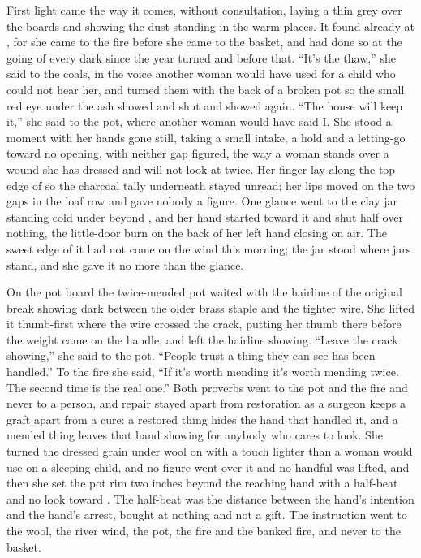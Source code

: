 First light came the way it comes, without consultation, laying a thin grey over the boards and showing the dust standing in the warm places. It found  already at , for she came to the fire before she came to the basket, and had done so at the going of every dark since the year turned and before that. “It's the thaw,” she said to the coals, in the voice another woman would have used for a child who could not hear her, and turned them with the back of a broken pot so the small red eye under the ash showed and shut and showed again. “The house will keep it,” she said to the pot, where another woman would have said I. She stood a moment with her hands gone still, taking a small intake, a hold and a letting-go toward no opening, with neither gap figured, the way a woman stands over a wound she has dressed and will not look at twice. Her finger lay along the top edge of  so the charcoal tally underneath stayed unread; her lips moved on the two gaps in the loaf row and gave nobody a figure. One glance went to the clay jar standing cold under  beyond , and her hand started toward it and shut half over nothing, the little-door burn on the back of her left hand closing on air. The sweet edge of it had not come on the wind this morning; the jar stood where jars stand, and she gave it no more than the glance.

On the pot board the twice-mended pot waited with the hairline of the original break showing dark between the older brass staple and the tighter wire. She lifted it thumb-first where the wire crossed the crack, putting her thumb there before the weight came on the handle, and left the hairline showing. “Leave the crack showing,” she said to the pot. “People trust a thing they can see has been handled.” To the fire she said, “If it's worth mending it's worth mending twice. The second time is the real one.” Both proverbs went to the pot and the fire and never to a person, and repair stayed apart from restoration as a surgeon keeps a graft apart from a cure: a restored thing hides the hand that handled it, and a mended thing leaves that hand showing for anybody who cares to look. She turned the dressed grain under wool on  with a touch lighter than a woman would use on a sleeping child, and no figure went over it and no handful was lifted, and then she set the pot rim two inches beyond the reaching hand with a half-beat and no look toward . The half-beat was the distance between the hand's intention and the hand's arrest, bought at nothing and not a gift. The instruction went to the wool, the river wind, the pot, the fire and the banked fire, and never to the basket.

